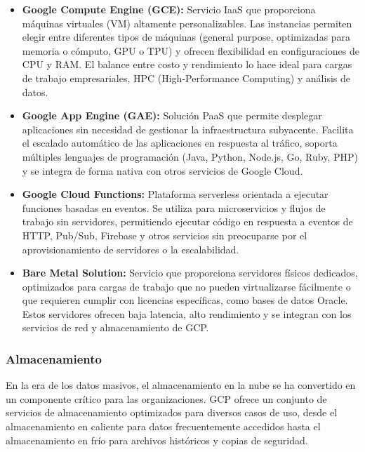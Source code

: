 {                \begin{itemize}
                    \item \textbf{Google Compute Engine (GCE):} Servicio IaaS que proporciona máquinas virtuales (VM) altamente personalizables. Las instancias permiten elegir entre diferentes tipos de máquinas (general purpose, optimizadas para memoria o cómputo, GPU o TPU) y ofrecen flexibilidad en configuraciones de CPU y RAM. El balance entre costo y rendimiento lo hace ideal para cargas de trabajo empresariales, HPC (High-Performance Computing) y análisis de datos.
                    \item \textbf{Google App Engine (GAE):} Solución PaaS que permite desplegar aplicaciones sin necesidad de gestionar la infraestructura subyacente. Facilita el escalado automático de las aplicaciones en respuesta al tráfico, soporta múltiples lenguajes de programación (Java, Python, Node.js, Go, Ruby, PHP) y se integra de forma nativa con otros servicios de Google Cloud.
                    \item \textbf{Google Cloud Functions:} Plataforma serverless orientada a ejecutar funciones basadas en eventos. Se utiliza para microservicios y flujos de trabajo sin servidores, permitiendo ejecutar código en respuesta a eventos de HTTP, Pub/Sub, Firebase y otros servicios sin preocuparse por el aprovisionamiento de servidores o la escalabilidad.
                    \item \textbf{Bare Metal Solution:} Servicio que proporciona servidores físicos dedicados, optimizados para cargas de trabajo que no pueden virtualizarse fácilmente o que requieren cumplir con licencias específicas, como bases de datos Oracle. Estos servidores ofrecen baja latencia, alto rendimiento y se integran con los servicios de red y almacenamiento de GCP.
                \end{itemize}
            
            \subsubsection{Almacenamiento}
                En la era de los datos masivos, el almacenamiento en la nube se ha convertido en un componente crítico para las organizaciones. GCP ofrece un conjunto de servicios de almacenamiento optimizados para diversos casos de uso, desde el almacenamiento en caliente para datos frecuentemente accedidos hasta el almacenamiento en frío para archivos históricos y copias de seguridad.
                
}
